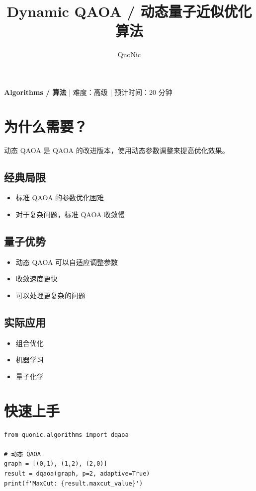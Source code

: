 \documentclass[12pt,a4paper]{article}
\title{Dynamic QAOA / 动态量子近似优化算法}
\author{QuoNic}
\date{}
\begin{document}
\maketitle

\begin{center}
\textbf{Algorithms / 算法} | 难度：高级 | 预计时间：20 分钟
\end{center}

\tableofcontents
\newpage

\section{为什么需要？}

动态 QAOA 是 QAOA 的改进版本，使用动态参数调整来提高优化效果。

\subsection{经典局限}
\begin{itemize}
  \item 标准 QAOA 的参数优化困难
  \item 对于复杂问题，标准 QAOA 收敛慢
\end{itemize}

\subsection{量子优势}
\begin{itemize}
  \item 动态 QAOA 可以自适应调整参数
  \item 收敛速度更快
  \item 可以处理更复杂的问题
\end{itemize}

\subsection{实际应用}
\begin{itemize}
  \item 组合优化
  \item 机器学习
  \item 量子化学
\end{itemize}

\section{快速上手}

\begin{verbatim}
from quonic.algorithms import dqaoa

# 动态 QAOA
graph = [(0,1), (1,2), (2,0)]
result = dqaoa(graph, p=2, adaptive=True)
print(f'MaxCut: {result.maxcut_value}')
\end{verbatim}
\end{document}
